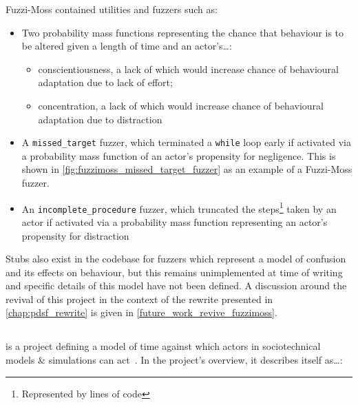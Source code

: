 Fuzzi-Moss contained utilities and fuzzers such as:

\begin{itemize}
    \item Two probability mass functions representing the chance that
    behaviour is to be altered given a length of time and an actor's\ldots{}:
    \begin{itemize}
        \item conscientiousness, a lack of which would increase chance of behavioural adaptation due to lack
    of effort;
        \item concentration, a lack of which would increase chance of behavioural
    adaptation due to distraction
    \end{itemize}
    \item A \lstinline{missed_target} fuzzer, which terminated a
    \lstinline{while} loop early if activated via a probability mass function of
    an actor's propensity for negligence. This is shown in
    \cref{fig:fuzzimoss_missed_target_fuzzer} as an example of a Fuzzi-Moss
    fuzzer.
    \item An \lstinline{incomplete_procedure} fuzzer, which truncated the
    steps\footnote{Represented by lines of code} taken by an actor if activated
    via a probability mass function representing an actor's propensity for
    distraction
\end{itemize}

Stubs also exist in the \pdsf{} codebase for fuzzers which represent a model of
confusion and its effects on behaviour, but this remains unimplemented at time
of writing and specific details of this model have not been defined. A
discussion around the revival of this project in the context of the \pdsf
rewrite presented in \cref{chap:pdsf_rewrite} is given in
\cref{future_work_revive_fuzzimoss}. 


\subsection{\theatreag{}}\label{subsec:prior_work_theatre}

\theatreag{} is a project defining a model of time against which actors in
sociotechnical models \& simulations can act~\cite{theatre_ag_repo}. In the
project's overview, it describes itself as\ldots{}:

